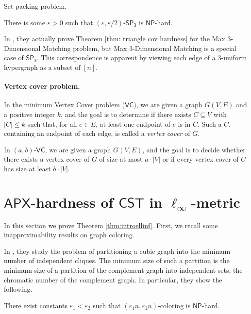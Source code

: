 \documentclass{theoretics}
\newcommand{\1}{\textbf{1}}
\newcommand{\cst}{$\mathsf{CST}$\xspace}
\newcommand{\setpT}{$\mathsf{SP_3}$\xspace}
\newcommand{\np}{$\mathsf{NP}$\xspace}
\newcommand{\apx}{$\mathsf{APX}$\xspace}
\newcommand{\vcov}{$\mathsf{VC}$\xspace}
\begin{document}
\begin{paragraph}{Set packing problem.}
\begin{theorem} \label{thm: triangle cov hardness}
There is some $\varepsilon > 0$ such that $(\varepsilon, \varepsilon/2)$-\setpT is \np-hard.
\end{theorem}

In \cite{Petrank_1994}, they actually prove Theorem \ref{thm: triangle cov hardness} for the Max 3-Dimensional Matching problem, but Max 3-Dimensional Matching is a special case of \setpT. This correspondence is apparent by viewing each edge of a $3$-uniform hypergraph as a subset of $[n]$.
\end{paragraph}

\paragraph{Vertex cover problem.} In the minimum Vertex Cover problem (\vcov), we are given a graph $G(V,E)$ and a positive integer $k$, and the goal is to determine if there exists $C \subseteq V$ with $|C| \leq k$ such that, for all $e \in E$, at least one endpoint of $e$ is in ${C}$. Such a $C$, containing an endpoint of each edge, is called a \textit{vertex cover} of $G$.

In $(a, b)$-\vcov, we are given a graph $G(V,E)$, and the goal is to decide whether there exists a vertex cover of $G$ of size at most $a \cdot |V|$ or if every vertex cover of $G$ has size at least $b \cdot |V|$.





\section{\texorpdfstring{\apx-hardness of \cst in $\ell_\infty$-metric}{APX-hardness of CST in linf-metric}} \label{sec: l_inf cst hardness}

In this section we prove Theorem \ref{thm:introellinf}. First, we recall some inapproximability results on graph coloring. 


In \cite{Cerioli_Faria_Ferreira_Martinhon_Protti_Reed_2008}, they study the problem of partitioning a cubic graph into the minimum number of independent cliques. The minimum size of such a partition is the minimum size of a partition of the complement graph into independent sets, the chromatic number of the complement graph. In particular, they show the following.
\begin{theorem} \label{thm: hardness of linear chromatic number}
There exist constants $\varepsilon_1 < \varepsilon_2$ such that $(\varepsilon_1 n, \varepsilon_2 n)$-coloring is \np-hard. 
\end{theorem}
\end{document}
